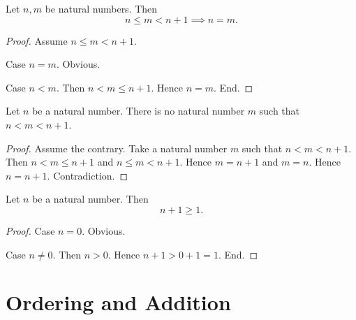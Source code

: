\documentclass[10pt]{article}
\begin{document}
  \begin{forthel}
    \begin{proposition}
      Let $n, m$ be natural numbers.
      Then \[ n \leq m < n + 1 \implies n = m. \]
    \end{proposition}
    \begin{proof}
      Assume $n \leq m < n + 1$.

      Case $n = m$. Obvious.

      Case $n < m$.
        Then $n < m \leq n + 1$.
        Hence $n = m$.
      End.
    \end{proof}
  \end{forthel}

  \begin{forthel}
    \begin{corollary}
      Let $n$ be a natural number.
      There is no natural number $m$ such that $n < m < n + 1$.
    \end{corollary}
    \begin{proof}
      Assume the contrary.
      Take a natural number $m$ such that $n < m < n + 1$.
      Then $n < m \leq n + 1$ and $n \leq m < n + 1$.
      Hence $m = n + 1$ and $m = n$.
      Hence $n = n + 1$.
      Contradiction.
    \end{proof}
  \end{forthel}

  \begin{forthel}
    \begin{proposition}
      Let $n$ be a natural number.
      Then \[ n + 1 \geq 1. \]
    \end{proposition}
    \begin{proof}
      Case $n = 0$. Obvious.

      Case $n \neq 0$.
        Then $n > 0$.
        Hence $n + 1 > 0 + 1 = 1$.
      End.
    \end{proof}
  \end{forthel}


  \section{Ordering and Addition}
\end{document}
